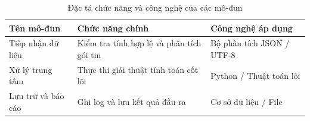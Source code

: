 \begin{table}[H]
    \caption{Đặc tả chức năng và công nghệ của các mô-đun}
    \label{tab:sample_specifications}
    \centering
    \begin{tabular}{|l|p{6.5cm}|p{4cm}|}
        \hline
        \textbf{Tên mô-đun} & \textbf{Chức năng chính} & \textbf{Công nghệ áp dụng} \\ \hline
        Tiếp nhận dữ liệu & Kiểm tra tính hợp lệ và phân tích gói tin & Bộ phân tích JSON / UTF-8 \\ \hline
        Xử lý trung tâm & Thực thi giải thuật tính toán cốt lõi & Python / Thuật toán lõi \\ \hline
        Lưu trữ và báo cáo & Ghi log và lưu kết quả đầu ra & Cơ sở dữ liệu / File \\ \hline
    \end{tabular}
\end{table}
